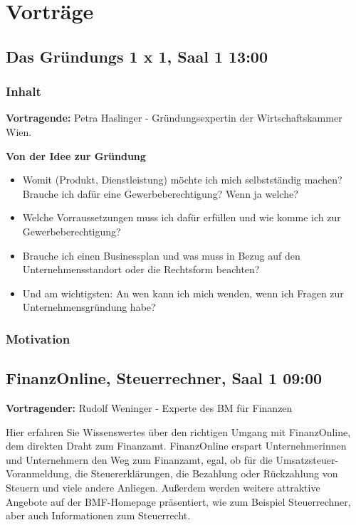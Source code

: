 
\section{Vorträge}
\label{sec:Ergebnisse}
\subsection{Das Gründungs 1 x 1, Saal 1 13:00}
\subsubsection{Inhalt}
	\textbf{Vortragende:} Petra Haslinger - Gründungsexpertin der Wirtschaftskammer Wien.
	
	\textbf{Von der Idee zur Gründung}
	\begin{itemize}
		\item Womit (Produkt, Dienstleistung) möchte ich mich selbstständig machen? Brauche ich dafür eine Gewerbeberechtigung? Wenn ja welche?
		\item Welche Vorraussetzungen muss ich dafür erfüllen und wie komme ich zur Gewerbeberechtigung?
		\item Brauche ich einen Businessplan und was muss in Bezug auf den Unternehmensstandort oder die Rechtsform beachten?
		\item Und am wichtigsten: An wen kann ich mich wenden, wenn ich Fragen zur Unternehmensgründung habe?
	\end{itemize}
\subsubsection{Motivation}

\subsection{FinanzOnline, Steuerrechner, Saal 1 09:00}
\textbf{Vortragender:} Rudolf Weninger - Experte des BM für Finanzen

Hier erfahren Sie Wissenswertes über den richtigen Umgang mit FinanzOnline, dem direkten Draht zum Finanzamt. FinanzOnline erspart Unternehmerinnen und Unternehmern den Weg zum Finanzamt, egal, ob für die Umsatzsteuer-Voranmeldung, die Steuererklärungen, die Bezahlung oder Rückzahlung von Steuern und viele andere Anliegen. Außerdem werden weitere attraktive Angebote auf der BMF-Homepage präsentiert, wie zum Beispiel Steuerrechner, aber auch Informationen zum Steuerrecht.

